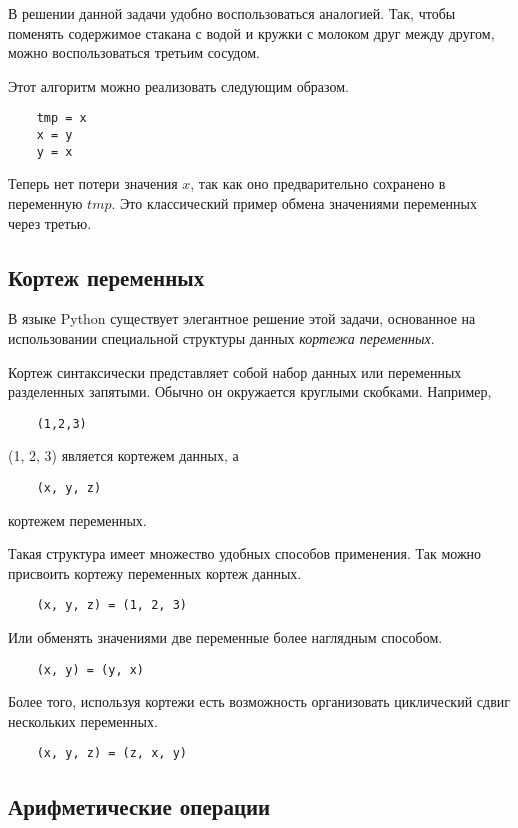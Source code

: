 \documentclass[a4paper, fleqn]{article}
\begin{document}
	В решении данной задачи удобно воспользоваться аналогией. Так, чтобы поменять содержимое стакана с водой и кружки с молоком друг между другом, можно воспользоваться третьим сосудом.
	
	Этот алгоритм можно реализовать следующим образом.
	\begin{lstlisting}
	tmp = x
	x = y
	y = x
	\end{lstlisting}
	Теперь нет потери значения $x$, так как оно предварительно сохранено в переменную $tmp$. Это классический пример обмена значениями переменных через третью.
	
	\subsection*{Кортеж переменных}
	
	В языке Python существует элегантное решение этой задачи, основанное на использовании специальной структуры данных \emph{кортежа переменных}.
	
	Кортеж синтаксически представляет собой набор данных или переменных разделенных запятыми. Обычно он окружается круглыми скобками. Например,
	\begin{lstlisting}
	(1,2,3)
	\end{lstlisting}
	(1, 2, 3)
	является кортежем данных, а
	\begin{lstlisting}
	(x, y, z)
	\end{lstlisting}
	кортежем переменных.
	
	Такая структура имеет множество удобных способов применения. Так можно присвоить кортежу переменных кортеж данных.
	\begin{lstlisting}
	(x, y, z) = (1, 2, 3)
	\end{lstlisting}
	
	Или обменять значениями две переменные более наглядным способом.
	\begin{lstlisting}
	(x, y) = (y, x)
	\end{lstlisting}
	
	Более того, используя кортежи есть возможность организовать циклический сдвиг нескольких переменных.
	\begin{lstlisting}
	(x, y, z) = (z, x, y)
	\end{lstlisting}
	
	
	\subsection*{Арифметические операции}
	
\end{document}
